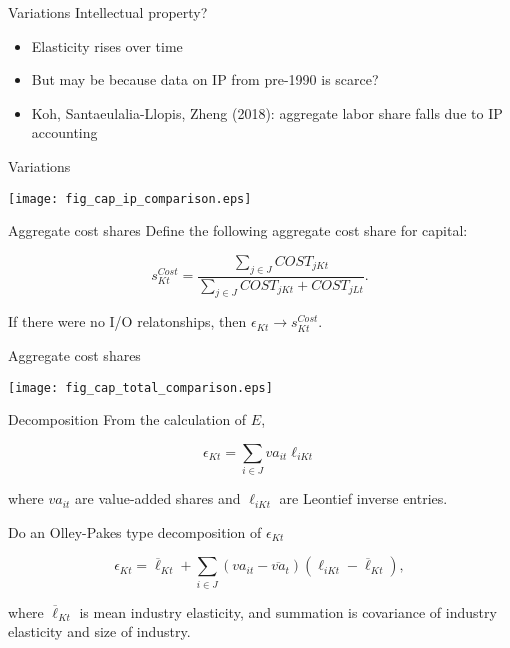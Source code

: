 \documentclass[10pt, xcolor=dvipsnames]{beamer}
\begin{document}
\begin{frame}{Variations}
Intellectual property?

\begin{itemize}
  \item Elasticity rises over time
  \item But may be because data on IP from pre-1990 is scarce?
  \item Koh, Santaeulalia-Llopis, Zheng (2018): aggregate labor share falls due to IP accounting
\end{itemize}

\end{frame}

\begin{frame}{Variations}
\begin{center}
\texttt{[image: fig\_cap\_ip\_comparison.eps]}
\end{center}
\end{frame}

\begin{frame}{Aggregate cost shares}
Define the following aggregate cost share for capital:

\begin{equation}
  s^{Cost}_{Kt} = \frac{\sum_{j \in J} COST_{jKt}}{\sum_{j \in J} COST_{jKt} + COST_{jLt}}. \label{EQ_scost}
\end{equation}

If there were no I/O relatonships, then $\epsilon_{Kt} \rightarrow s^{Cost}_{Kt}$. 

\end{frame}

\begin{frame}{Aggregate cost shares}
\begin{center}
\texttt{[image: fig\_cap\_total\_comparison.eps]}
\end{center}
\end{frame}


\begin{frame}{Decomposition}
From the calculation of $E$,

\begin{equation}
  \epsilon_{Kt} = \sum_{i \in J} va_{it} \ell_{iKt}
\end{equation}

where $va_{it}$ are value-added shares and $\ell_{iKt}$ are Leontief inverse entries. 

\vspace{.25in} Do an Olley-Pakes type decomposition of $\epsilon_{Kt}$

\begin{equation}
  \epsilon_{Kt} = \overline{\ell}_{Kt} + \sum_{i \in J} (va_{it} - \overline{va}_{t})(\ell_{iKt}-\overline{\ell}_{Kt}), \label{EQ_op}
\end{equation}

where $\overline{\ell}_{Kt}$ is mean industry elasticity, and summation is covariance of industry elasticity and size of industry.

\end{frame}
\end{document}
